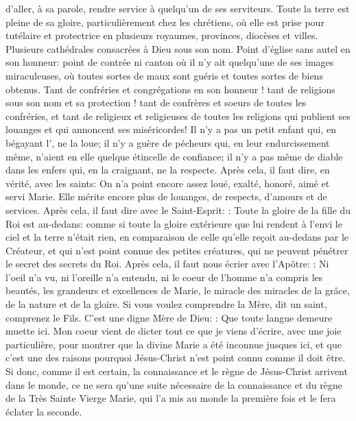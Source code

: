 d'aller, à sa parole, rendre service à quelqu'un de ses serviteurs.
 Toute la terre est pleine de sa gloire, particulièrement chez les chrétiens, où elle est prise pour tutélaire et
protectrice en plusieurs royaumes, provinces, diocèses et villes. Plusieurs cathédrales consacrées à Dieu sous son
nom. Point d'église sans autel en son honneur: point de contrée ni canton où il n'y ait quelqu'une de ses images
miraculeuses, où toutes sortes de maux sont guéris et toutes sortes de biens obtenus. Tant de confréries et
congrégations en son honneur ! tant de religions sous son nom et sa protection ! tant de confrères et soeurs de
toutes les confréries, et tant de religieux et religieuses de toutes les religions qui publient ses louanges et qui
annoncent ses miséricordes! Il n'y a pas un petit enfant qui, en bégayant l', ne la loue; il n'y a guère de
pécheurs qui, en leur endurcissement même, n'aient en elle quelque étincelle de confiance; il n'y a pas même de
diable dans les enfers qui, en la craignant, ne la respecte.
 Après cela, il faut dire, en vérité, avec les saints:
On n'a point encore assez loué, exalté, honoré, aimé et servi Marie. Elle mérite encore plus de louanges, de
respects, d'amours et de services.
 Après cela, il faut dire avec le Saint-Esprit: : Toute la gloire de la fille du
Roi est au-dedans: comme si toute la gloire extérieure que lui rendent à l'envi le ciel et la terre n'était rien, en
comparaison de celle qu'elle reçoit au-dedans par le Créateur, et qui n'est point connue des petites créatures, qui
ne peuvent pénétrer le secret des secrets du Roi.
 Après cela, il faut nous écrier avec l'Apôtre: : Ni
l'oeil n'a vu, ni l'oreille n'a entendu, ni le coeur de l'homme n'a compris les beautés, les grandeurs et excellences
de Marie, le miracle des miracles de la grâce, de la nature et de la gloire. Si vous voulez comprendre la Mère, dit
un saint, comprenez le Fils. C'est une digne Mère de Dieu: : Que toute langue demeure
muette ici.
 Mon coeur vient de dicter tout ce que je viens d'écrire, avec une joie particulière, pour montrer que la divine
Marie a été inconnue jusques ici, et que c'est une des raisons pourquoi Jésus-Christ n'est point connu comme il
doit être. Si donc, comme il est certain, la connaissance et le règne de Jésus-Christ arrivent dans le monde, ce ne
sera qu'une suite nécessaire de la connaissance et du règne de la Très Sainte Vierge Marie, qui l'a mis au monde
la première fois et le fera éclater la seconde.

